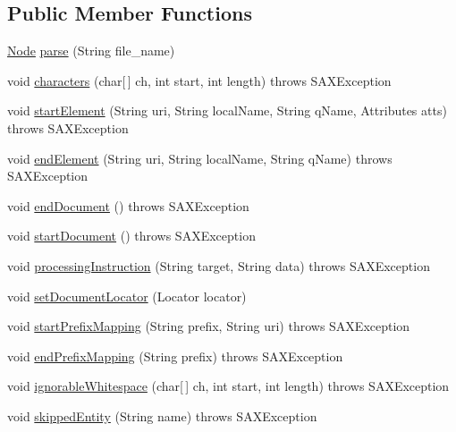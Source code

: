 \subsection*{Public Member Functions}
\begin{DoxyCompactItemize}
\item 
\hyperlink{classch_1_1zhaw_1_1ba10__bsha__1_1_1graph_1_1Node}{Node} \hyperlink{classch_1_1zhaw_1_1ba10__bsha__1_1_1graph_1_1GraphMLParser_ae127bee890029b56abc11c84d2badd1c}{parse} (String file\_\-name)
\item 
void \hyperlink{classch_1_1zhaw_1_1ba10__bsha__1_1_1graph_1_1GraphMLParser_aaf97af9462bb91aabd817d1be6c32f6e}{characters} (char\mbox{[}$\,$\mbox{]} ch, int start, int length)  throws SAXException 
\item 
void \hyperlink{classch_1_1zhaw_1_1ba10__bsha__1_1_1graph_1_1GraphMLParser_a0e853ca6043b2cb4f676c915209d3abe}{startElement} (String uri, String localName, String qName, Attributes atts)  throws SAXException 
\item 
void \hyperlink{classch_1_1zhaw_1_1ba10__bsha__1_1_1graph_1_1GraphMLParser_a3121ca1de0dbf5cc9e7d262608f55f52}{endElement} (String uri, String localName, String qName)  throws SAXException 
\item 
void \hyperlink{classch_1_1zhaw_1_1ba10__bsha__1_1_1graph_1_1GraphMLParser_a644cce55a39c7d1acb1625b7903a6522}{endDocument} ()  throws SAXException 
\item 
void \hyperlink{classch_1_1zhaw_1_1ba10__bsha__1_1_1graph_1_1GraphMLParser_ae7ac9d9c1d64eecaf87b1a68d65ae5c0}{startDocument} ()  throws SAXException 
\item 
void \hyperlink{classch_1_1zhaw_1_1ba10__bsha__1_1_1graph_1_1GraphMLParser_a4db4f0e906963188c539de8c429477c3}{processingInstruction} (String target, String data)  throws SAXException 
\item 
void \hyperlink{classch_1_1zhaw_1_1ba10__bsha__1_1_1graph_1_1GraphMLParser_aff550f1ff85c53385477bfe9b674323b}{setDocumentLocator} (Locator locator)
\item 
void \hyperlink{classch_1_1zhaw_1_1ba10__bsha__1_1_1graph_1_1GraphMLParser_aef06cdfd0c74659d1fdbb66fd20af1d7}{startPrefixMapping} (String prefix, String uri)  throws SAXException 
\item 
void \hyperlink{classch_1_1zhaw_1_1ba10__bsha__1_1_1graph_1_1GraphMLParser_a79c9275778e96cb44d16b466a2a58075}{endPrefixMapping} (String prefix)  throws SAXException 
\item 
void \hyperlink{classch_1_1zhaw_1_1ba10__bsha__1_1_1graph_1_1GraphMLParser_ac4e0c2da8416b919f9841b646f3d058d}{ignorableWhitespace} (char\mbox{[}$\,$\mbox{]} ch, int start, int length)  throws SAXException 
\item 
void \hyperlink{classch_1_1zhaw_1_1ba10__bsha__1_1_1graph_1_1GraphMLParser_ac3138b26d478aef2b67820bf35cd3b1f}{skippedEntity} (String name)  throws SAXException 
\end{DoxyCompactItemize}
